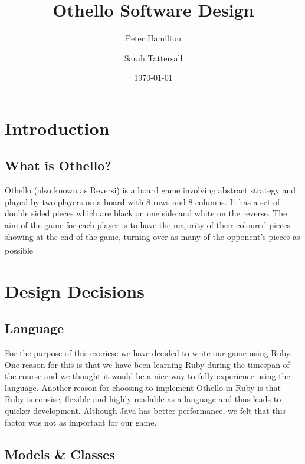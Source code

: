 \documentclass[a4wide, 11pt]{article}
\begin{document}
  \title{Othello Software Design}

  \author{Peter Hamilton \and Sarah Tattersall}

  \date{\today}         %

  \maketitle            %

  \pagebreak

  \section{Introduction}
  \subsection{What is Othello?}
  Othello (also known as Reversi) is a board game involving abstract strategy and played by two players on a board with 8 rows and 8 columns. It has a set of double 
  sided pieces which are black on one side and white on the reverse. The aim of the game for each player is to have the majority of their coloured pieces showing at
  the end of the game, turning over as many of the opponent's pieces as possible \textsuperscript{\cite{wikiothello}}

  \section{Design Decisions}
  \subsection{Language}
  For the purpose of this exericse we have decided to write our game using Ruby. One reason for this is that we have been learning Ruby during the timespan of the
  course and we thought it would be a nice way to fully experience using the language. Another reason for choosing to implement Othello in Ruby is that Ruby is
  consise, flexible and highly readable as a language and thus leads to quicker development. Although Java has better performance, we felt that this factor was not
  as important for our game.

  \subsection{Models \& Classes}
\end{document}
